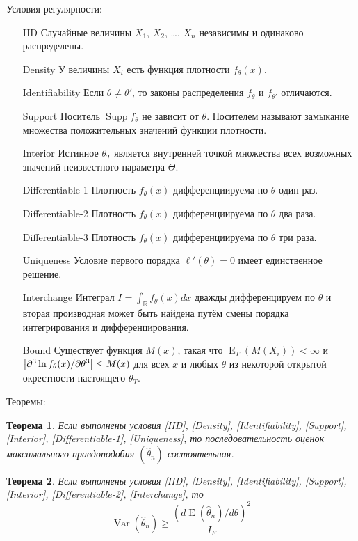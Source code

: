 \documentclass[12pt, a4paper]{article}
\DeclareMathOperator{\Var}{Var}
\DeclareMathOperator{\E}{E}
\DeclareMathOperator{\Supp}{Supp}
\newcommand{\RR}{\mathbb{R}}
\newtheorem{theorem}{Теорема}
\begin{document}
Условия регулярности:
\begin{itemize}[align=parleft, leftmargin=-1cm, itemindent=7cm, labelsep=2cm, labelwidth=4cm]
  \item [IID] Случайные величины $X_1$, $X_2$, \ldots, $X_n$ независимы и одинаково распределены.
  \item [Density] У величины $X_i$ есть функция плотности $f_{\theta}(x)$.
  \item [Identifiability] Если $\theta \neq \theta'$, то законы распределения $f_\theta$ и $f_{\theta'}$ отличаются.
  \item [Support] Носитель $\Supp f_\theta$ не зависит от $\theta$. 
  Носителем называют замыкание множества положительных значений функции плотности. 
  \item [Interior] Истинное $\theta_T$ является внутренней точкой множества всех возможных значений неизвестного параметра $\Theta$.
  \item [Differentiable-1] Плотность $f_\theta(x)$ дифференциируема по $\theta$ один раз.
  \item [Differentiable-2] Плотность $f_\theta(x)$ дифференциируема по $\theta$ два раза.
  \item [Differentiable-3] Плотность $f_\theta(x)$ дифференциируема по $\theta$ три раза.
\item [Uniqueness] Условие первого порядка $\ell'(\theta)=0$ имеет единственное решение. 
\item [Interchange] Интеграл $I = \int_{\RR} f_\theta (x) dx$ дважды дифференцируем по $\theta$ и 
вторая производная может быть найдена путём смены порядка интегрирования и дифференцирования.
\item [Bound] Существует функция $M(x)$, такая что 
$\E_T(M(X_i)) < \infty$ и $\abs{\partial^3 \ln f_\theta(x)/\partial \theta^3} \leq M(x)$ для всех $x$ 
и любых $\theta$ из некоторой открытой окрестности настоящего $\theta_T$.
\end{itemize}



Теоремы:

\begin{theorem}
  Если выполнены условия [IID], [Density], [Identifiability], [Support], [Interior], [Differentiable-1], [Uniqueness], то 
  последовательность оценок максимального правдоподобия $(\hat \theta_n)$ состоятельная. 
\end{theorem}

\begin{theorem}
  Если выполнены условия [IID], [Density], [Identifiability], [Support], [Interior], [Differentiable-2], [Interchange], то 
  \[
  \Var(\hat \theta_n) \geq \frac{(d \E(\hat\theta_n) / d\theta )^2}{I_F}  
  \]
\end{theorem}
\end{document}
